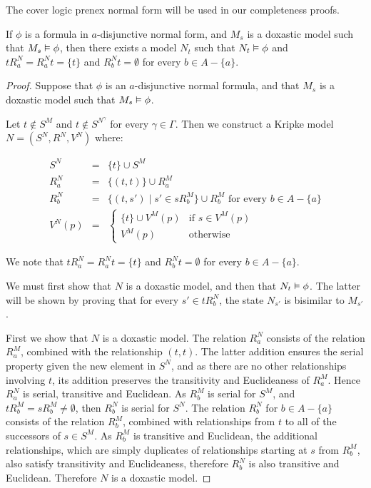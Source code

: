 The cover logic prenex normal form will be used in our completeness proofs.

\begin{lemma}\label{kd45-successors}
If $\phi$ is a formula in $a$-disjunctive normal form, and $M_s$ is a doxastic
model such that $M_s \vDash \phi$, then there exists a model $N_t$ such that
$N_t \vDash \phi$ and $tR^N_a = R^N_at = \{t\}$ and $R^N_bt = \emptyset$ for
every $b \in A - \{a\}$.
\end{lemma}

\begin{proof}
Suppose that $\phi$ is an $a$-disjunctive normal formula, and that $M_s$ is a
doxastic model such that $M_s \vDash \phi$. 

Let $t \notin S^M$ and $t \notin S^{N^\gamma}$ for every $\gamma \in \Gamma$.
Then we construct a Kripke model $N = (S^N, R^N, V^N)$ where:

\begin{eqnarray*}
S^N &=& \{t\} \cup S^M\\
R^N_a &=& \{(t, t)\} \cup R^M_a\\
R^N_b &=& \{(t, s') \mid s' \in sR^M_b\} \cup R^M_b \text{ for every $b \in A -
\{a\}$}\\
V^N(p) &=& \begin{cases}
\{t\} \cup V^M(p) & \text{if $s \in V^M(p)$}\\
V^M(p) & \text{otherwise}
\end{cases}
\end{eqnarray*}

We note that $tR^N_a = R^N_at = \{t\}$ and $R^N_bt = \emptyset$ for every $b
\in A - \{a\}$.

We must first show that $N$ is a doxastic model, and then that $N_t \vDash
\phi$. The latter will be shown by proving that for every $s' \in tR^N_b$, the
state $N_{s'}$ is bisimilar to $M_{s'}$.

First we show that $N$ is a doxastic model. The relation $R^N_a$ consists of the
relation $R^M_a$, combined with the relationship $(t,t)$. The latter addition
ensures the serial property given the new element in $S^N$, and as there are no
other relationships involving $t$, its addition preserves the transitivity and
Euclideaness of $R^M_a$. Hence $R^N_a$ is serial, transitive and Euclidean.
As $R^M_b$ is serial for $S^M$, and $tR^M_b = sR^M_b \ne \emptyset$, then
$R^N_b$ is serial for $S^N$. The relation $R^N_b$ for $b \in A - \{a\}$ consists
of the relation $R^M_b$, combined with relationships from $t$ to all of the
successors of $s \in S^M$. As $R^M_b$ is transitive and Euclidean, the
additional relationships, which are simply duplicates of relationships starting
at $s$ from $R^M_b$, also satisfy transitivity and Euclideaness, therefore
$R^N_b$ is also transitive and Euclidean. Therefore $N$ is a doxastic model.


\end{proof}
